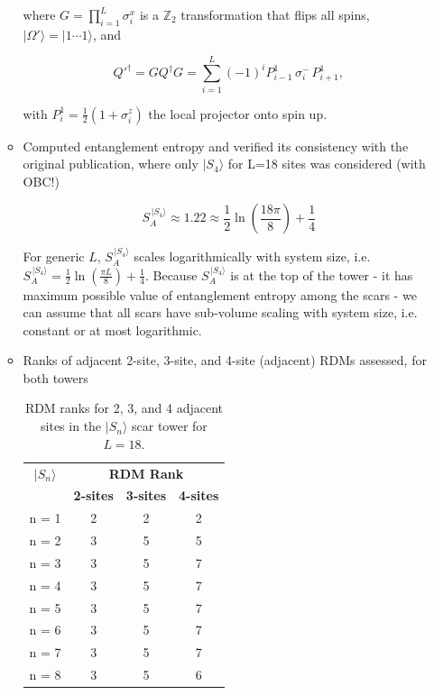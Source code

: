 \documentclass[11pt]{article}
\begin{document}
\begin{itemize}
\begin{itemize}
	\noindent where $G = \prod_{i=1}^L \sigma_i^x$ is a $\mathbb{Z}_2$ transformation that flips all spins, 
	$|\Omega'\rangle = |1 \cdots 1\rangle$, and
	
	\begin{equation}
	Q'^\dagger = G Q^\dagger G = \sum_{i = 1}^{L} (-1)^i P^1_{i-1} \, \sigma^-_i \, P^1_{i+1},
	\end{equation}
	
	\noindent with $P^1_i = \frac{1}{2}(1 + \sigma^z_i)$ the local projector onto spin up.
        \item Computed entanglement entropy and verified its consistency with the original publication, where only $|S_4\rangle$ for L=18 sites was considered (with OBC!)
        
        \begin{equation}
        S^{\,|S_4\rangle}_A \approx 1.22 \approx \frac{1}{2} \ln \left(\frac{18 \pi}{8}\right) + \frac{1}{4}
        \end{equation}
        
        For generic $L$, $S^{\,|S_4\rangle}_A$ scales logarithmically with system size, i.e. $S^{\,|S_4\rangle}_A = \frac{1}{2} \ln \left(\frac{\pi L}{8}\right) + \frac{1}{4}$. Because $S^{\,|S_4\rangle}_A$ is at the top of the tower - it has maximum possible 				value of entanglement entropy among the scars - we can assume that all scars have sub-volume scaling with system size, i.e. constant or at most logarithmic.
        
        \item Ranks of adjacent 2-site, 3-site, and 4-site (adjacent) RDMs assessed, for both towers
        
        \begin{table}[H]
	\centering
	\begin{tabular}{|c|ccc|}
	\hline
	\textbf{$|S_n\rangle$} & \multicolumn{3}{c|}{\textbf{RDM Rank}} \\
	\cline{2-4}
	& \textbf{2-sites} & \textbf{3-sites} & \textbf{4-sites} \\
	\hline
	 n = 1 & 2 & 2 & 2 \\
	 n = 2 & 3 & 5 & 5 \\
	 n = 3 & 3 & 5 & 7 \\
	 n = 4 & 3 & 5 & 7 \\  
	 n = 5 & 3 & 5 & 7 \\
	 n = 6 & 3 & 5 & 7 \\
	 n = 7 & 3 & 5 & 7 \\
	 n = 8 & 3 & 5 & 6 \\
	\hline
	\end{tabular}
	\caption{RDM ranks for 2, 3, and 4 adjacent sites in the $|S_n\rangle$ scar tower for $L=18$.}
	\label{tab:ranks1}
	\end{table}


\end{itemize}
\end{itemize}
\end{document}
